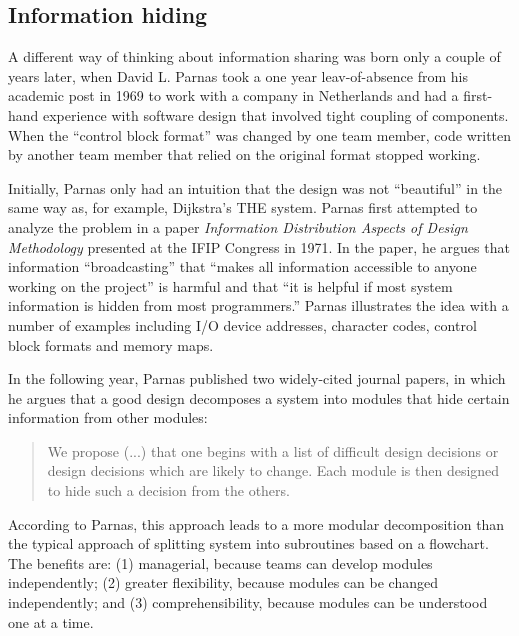 \subsection{Information hiding}
A different way of thinking about information sharing was born only a couple of years later,
when David L. Parnas took a one year leav-of-absence from his academic post in 1969 to work with a
company in Netherlands and had a first-hand experience with software design that involved tight
coupling of components. When the ``control block format'' was changed by one team member, code
written by another team member that relied on the original format stopped
working.

Initially, Parnas only had an intuition that the design was not ``beautiful'' in the same way
as, for example, Dijkstra's THE system. Parnas first attempted to
analyze the problem in a paper \emph{Information Distribution Aspects of Design
Methodology} presented at the IFIP Congress in 1971.
In the paper, he argues that information ``broadcasting'' that ``makes all information accessible
to anyone working on the project'' is harmful and that ``it is helpful if most system information
is hidden from most programmers.''
Parnas illustrates the idea with a number of examples including I/O device addresses, character
codes, control block formats and memory maps.

In the following year, Parnas published two widely-cited journal papers,
in which he argues that a good design decomposes a system into modules that hide certain
information from other modules:

\begin{quote}
We propose (...) that one begins with a list of difficult design decisions or design decisions
which are likely to change. Each module is then designed to hide such a decision from the
others.
\end{quote}

According to Parnas, this approach leads to a more modular decomposition than the typical
approach of splitting system into subroutines based on a flowchart. The benefits
are: (1) managerial, because teams can develop
modules independently; (2) greater flexibility, because modules can be changed independently; and
(3) comprehensibility, because modules can be understood one at a time.

